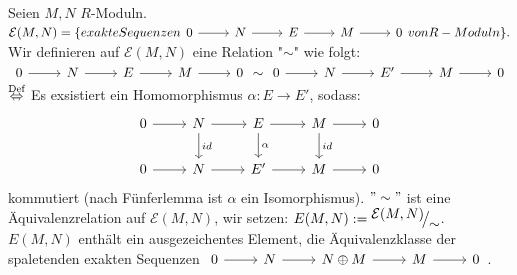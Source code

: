\begin{bem+df}
	Seien $M,N $ $R$-Moduln. \\
	$ \mathcal{E}(M,N) = \{exakte Sequenzen \begin{tikzcd}
	0\arrow{r} & N \arrow{r} & E\arrow{r} & M \arrow{r} & 0
	\end{tikzcd} von R-Moduln\}. $ Wir definieren auf $\mathcal{E}(M,N) $ eine Relation "$\sim$" wie folgt: \\
	$\begin{tikzcd}
	0\arrow{r} & N \arrow{r} & E\arrow{r} & M \arrow{r} & 0
	\end{tikzcd} \sim \begin{tikzcd}
	0\arrow{r} & N \arrow{r} & E'\arrow{r} & M \arrow{r} & 0
	\end{tikzcd}$ 
	$\overset{\text{Def}}{\Leftrightarrow}$ Es exsistiert ein Homomorphismus $\alpha:E \to E'$, sodass: 
	$$\begin{tikzcd}
	0\arrow{r} & N\arrow{d}{id} \arrow{r} & E\arrow{r} \arrow{d}{\alpha}& M\arrow{d}{id} \arrow{r} & 0\\
	0\arrow{r} & N \arrow{r} & E'\arrow{r} & M \arrow{r} & 0
	\end{tikzcd} $$ 
	kommutiert (nach Fünferlemma ist $\alpha$ ein Isomorphismus). $"\sim"$ ist eine Äquivalenzrelation auf $\mathcal{E}(M,N)$, wir setzen: $E(M,N) := \QR{\mathcal{E}(M,N)}{\sim}$. \\
	$E(M,N)$ enthält ein ausgezeichentes Element, die Äquivalenzklasse der spaletenden exakten Sequenzen $\begin{tikzcd}
	0\arrow{r} & N \arrow{r} & N \oplus M \arrow{r} & M \arrow{r} & 0
	\end{tikzcd}$.
\end{bem+df}